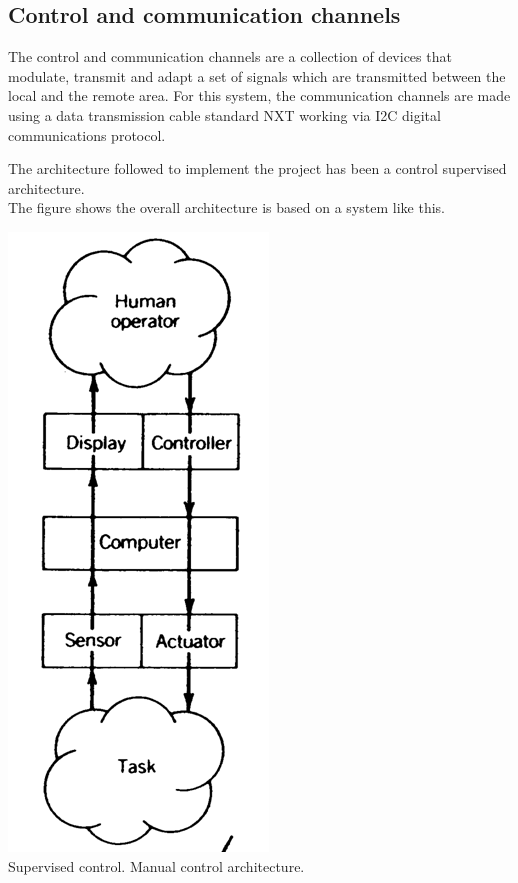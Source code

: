 \documentclass[a4paper,11pt]{article}
\begin{document}
\begin{multicols}{2}
			\subsection{Control and communication channels}
			
				The control and communication channels are a collection of devices that modulate, transmit and adapt a set of signals which are transmitted between the local and the remote area. For this system, the communication channels are made using a data transmission cable standard NXT working via I2C digital communications protocol.
			
		
			The architecture followed to implement the project has been a control supervised architecture.\\

			The figure shows the overall architecture is based on a system like this.\\
			
			\begin{center}
				\includegraphics[scale=0.5]{img/architecture.png}\\
				Supervised control. Manual control architecture.
			\end{center}


\end{multicols}
\end{document}
